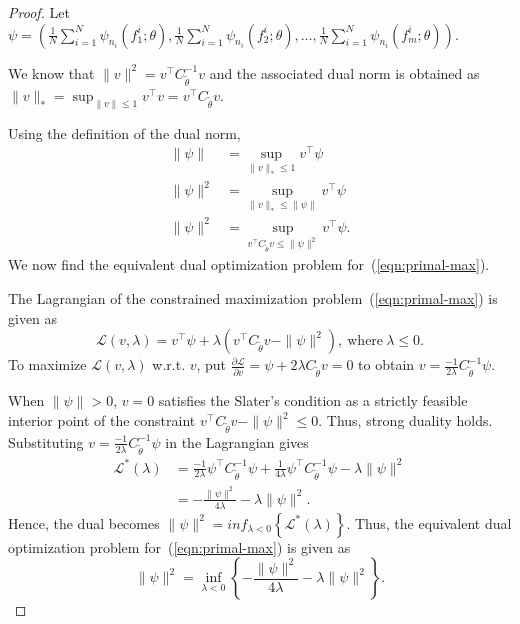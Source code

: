\documentclass{article}
\def\gL{{\mathcal{L}}}
\theoremstyle{definition}
\begin{document}
\begin{proof}
Let $\psi=(\frac{1}{N}\sum_{i=1}^{N}\psi_{n_i}(f_1^i;\theta), \frac{1}{N}\sum_{i=1}^{N}\psi_{n_i}(f_2^i;\theta), \dots, \frac{1}{N}\sum_{i=1}^{N}\psi_{n_i}(f_m^i;\theta))$.

We know that $\|v\|^2= v^\top C_{\tilde{\theta}}^{-1}v$ and the associated dual norm is obtained as $\|v\|_*= \sup_{\|v\|\leq 1} v^\top v= v^\top C_{\tilde{\theta}}v$.

Using the definition of the dual norm,
    \begin{align}
        \|\psi\|&=  \sup_{\|v\|_*\leq 1} v^\top \psi\nonumber\\
        \|\psi\|^2&=  \sup_{\|v\|_*\leq \|\psi\|} v^\top \psi\nonumber\\
        \|\psi\|^2&=  \sup_{v^\top C_{\tilde{\theta}}v \leq \|\psi\|^2} v^\top \psi\label{eqn:primal-max}.
    \end{align}
    We now find the equivalent dual optimization problem for~(\ref{eqn:primal-max}).
    
    The Lagrangian of the constrained maximization problem~(\ref{eqn:primal-max}) is given as
    \begin{equation*}
        \gL(v,\lambda)= v^\top \psi+\lambda(v^\top C_{\tilde{\theta}}v - \|\psi\|^2),~\text{where}~\lambda \le 0.
    \end{equation*} 
    To maximize $ \gL(v,\lambda)$ w.r.t. $v$, put $\frac{   \partial\gL}{\partial v}= \psi+2\lambda C_{\tilde{\theta}}v=0$ to obtain $v=\frac{-1}{2\lambda}C_{\tilde{\theta}}^{-1}\psi.$

    When $\|\psi\|> 0$, $v=0$ satisfies the Slater's condition as a strictly feasible interior point of the constraint $v^\top C_{\tilde{\theta}}v - \|\psi\|^2\leq 0$. Thus, strong duality holds.
    Substituting $v=\frac{-1}{2\lambda}C_{\tilde{\theta}}^{-1}\psi$ in the Lagrangian gives
     \begin{align*}
        \gL^*(\lambda)&= \frac{-1}{2\lambda}{\psi}^\top C_{\tilde{\theta}}^{-1}\psi+\frac{1}{4\lambda}{\psi}^\top C_{\tilde{\theta}}^{-1}\psi - \lambda\|\psi\|^2\\
       &= -\frac{\|\psi\|^2}{4\lambda} - \lambda\|\psi\|^2 .
    \end{align*}
    Hence, the dual becomes $\|\psi\|^2=inf_{\lambda <0}\left\{ \gL^*(\lambda)\right\}$. Thus, the equivalent dual optimization problem for~(\ref{eqn:primal-max}) is given as
    \begin{equation}
        \|\psi\|^2=\inf_{\lambda <0}\left\{-\frac{\|\psi\|^2}{4\lambda} - \lambda\|\psi\|^2 \right\}.
    \end{equation}


\end{proof}
\end{document}
